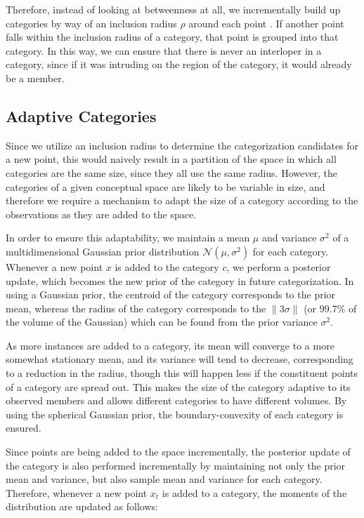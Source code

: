 Therefore, instead of looking at betweenness at all, we incrementally build up categories by way of an inclusion radius $\rho$ around each point \citep{wiggins2019learning}.  If another point falls within the inclusion radius of a category, that point is grouped into that category.  In this way, we can ensure that there is never an interloper in a category, since if it was intruding on the region of the category, it would already be a member.

\subsection{Adaptive Categories}
\label{section:adaptive-categories}

Since we utilize an inclusion radius to determine the categorization candidates for a new point, this would naively result in a partition of the space in which all categories are the same size, since they all use the same radius.  However, the categories of a given conceptual space are likely to be variable in size, and therefore we require a mechanism to adapt the size of a category according to the observations as they are added to the space.

In order to ensure this adaptability, we maintain a mean $\mu$ and variance $\sigma^2$ of a multidimensional Gaussian prior distribution $\mathcal{N}(\mu,\sigma^2)$ for each category.  Whenever a new point $x$ is added to the category $c$, we perform a posterior update, which becomes the new prior of the category in future categorization.  In using a Gaussian prior, the centroid of the category corresponds to the prior mean, whereas the radius of the category corresponds to the $\|3\sigma\|$ (or 99.7\% of the volume of the Gaussian) which can be found from the prior variance $\sigma^2$.

As more instances are added to a category, its mean will converge to a more somewhat stationary mean, and its variance will tend to decrease, corresponding to a reduction in the radius, though this will happen less if the constituent points of a category are spread out.  This makes the size of the category adaptive to its observed members and allows different categories to have different volumes.  By using the spherical Gaussian prior, the boundary-convexity of each category is ensured.

Since points are being added to the space incrementally, the posterior update of the category is also performed incrementally \citep{murphy2007conjugate} by maintaining not only the prior mean and variance, but also sample mean and variance for each category.  Therefore, whenever a new point $x_t$ is added to a category, the moments of the distribution are updated as follows:

